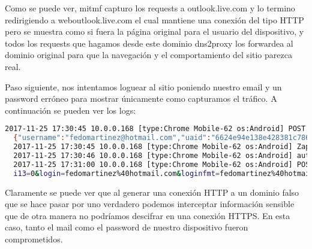 Como se puede ver, mitmf capturo los requests a outlook.live.com y lo termino redirigiendo a weboutlook.live.com el cual mantiene una conexión del tipo HTTP pero se muestra como si fuera la página original para el usuario del dispositivo, y todos los requests que hagamos desde este dominio dns2proxy los forwardea al dominio original para que la navegación y el comportamiento del sitio parezca real. 

Paso siguiente, nos intentamos loguear al sitio poniendo nuestro email y un password erróneo para mostrar únicamente como capturamos el tráfico. A continuación se pueden ver los logs:

\begin{lstlisting}[language=bash]
  2017-11-25 17:30:45 10.0.0.168 [type:Chrome Mobile-62 os:Android] POST Data (login.live.com):
  {"username":"fedomartinez@hotmail.com","uaid":"6624e94e138e428381c78633a1ab0e74","isOtherIdpSupported":false,"checkPhones":false,"isRemoteNGCSupported":true,"isCookieBannerShown":false,"isFidoSupported":false,"flowToken":"DQhHzeNTqKgxInlQhD31Nw0SsDGg7fJHgiMMlRv1h0E1CW!Aa4LxVqOMMnjVW6PLiF9GhG!OiSWI3hmjm7sieMn2*AysxGtCrV*OFOjsCncmhYVa*OLGWxKpw6wat5kyAk56pUr8xE*ac82nr6IWxvZ0XEIOqIHPMedKY2R2J*R47bzX34e7DNlSj1*lIXI6kAai7ZTgChw7YBHUQMyi!4cQTKAlGLTo28D*FPygvU!EG0OSa*mPnRxBol1fRmNZ3s5Unh2dDJgoQzFwDnSDswE$"}
  2017-11-25 17:30:45 10.0.0.168 [type:Chrome Mobile-62 os:Android] Zapped a strict-transport-security header
  2017-11-25 17:30:46 10.0.0.168 [type:Chrome Mobile-62 os:Android] auth.gfx.ms
  2017-11-25 17:31:00 10.0.0.168 [type:Chrome Mobile-62 os:Android] POST Data (login.live.com):
  i13=0&login=fedomartinez%40hotmail.com&loginfmt=fedomartinez%40hotmail.com&type=11&LoginOptions=3&lrt=&lrtPartition=&hisRegion=&hisScaleUnit=&passwd=prueba&ps=2&psRNGCDefaultType=&psRNGCEntropy=&psRNGCSLK=&psFidoAllowList=&canary=&ctx=&PPFT=DQhHzeNTqKgxInlQhD31Nw0SsDGg7fJHgiMMlRv1h0E1CW%21Aa4LxVqOMMnjVW6PLiF9GhG%21OiSWI3hmjm7sieMn2*AysxGtCrV*OFOjsCncmhYVa*OLGWxKpw6wat5kyAk56pUr8xE*ac82nr6IWxvZ0XEIOqIHPMedKY2R2J*R47bzX34e7DNlSj1*lIXI6kAai7ZTgChw7YBHUQMyi%214cQTKAlGLTo28D*FPygvU%21EG0OSa*mPnRxBol1fRmNZ3s5Unh2dDJgoQzFwDnSDswE%24&PPSX=Pa&NewUser=1&FoundMSAs=&fspost=0&i21=0&CookieDisclosure=0&i2=36&i17=0&i18=__ConvergedLoginPaginatedStrings%7C1%2C__ConvergedLogin_PCore%7C1%2C&i19=71540
\end{lstlisting}

Claramente se puede ver que al generar una conexión HTTP a un dominio falso que se hace pasar por uno verdadero podemos interceptar información sensible que de otra manera no podríamos descifrar en una conexión HTTPS. En esta caso, tanto el mail como el password de nuestro dispositivo fueron comprometidos.

